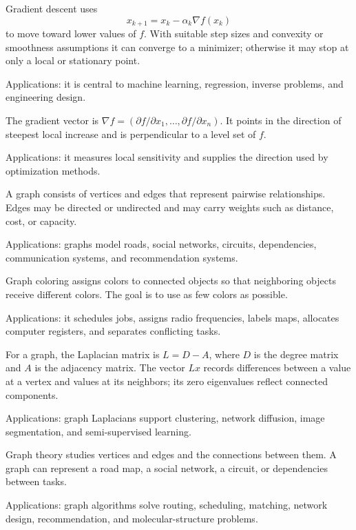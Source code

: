 Gradient descent uses
\[
x_{k+1}=x_k-\alpha_k\nabla f(x_k)
\]
to move toward lower values of $f$. With suitable step sizes and convexity or smoothness assumptions it can converge to a minimizer; otherwise it may stop at only a local or stationary point. \par\noindent Applications: it is central to machine learning, regression, inverse problems, and engineering design.

The gradient vector is $\nabla f=(\partial f/\partial x_1,\ldots,\partial f/\partial x_n)$. It points in the direction of steepest local increase and is perpendicular to a level set of $f$. \par\noindent Applications: it measures local sensitivity and supplies the direction used by optimization methods.

A graph consists of vertices and edges that represent pairwise relationships. Edges may be directed or undirected and may carry weights such as distance, cost, or capacity. \par\noindent Applications: graphs model roads, social networks, circuits, dependencies, communication systems, and recommendation systems.

Graph coloring assigns colors to connected objects so that neighboring objects receive different colors. The goal is to use as few colors as possible. \par\noindent Applications: it schedules jobs, assigns radio frequencies, labels maps, allocates computer registers, and separates conflicting tasks.

For a graph, the Laplacian matrix is $L=D-A$, where $D$ is the degree matrix and $A$ is the adjacency matrix. The vector $Lx$ records differences between a value at a vertex and values at its neighbors; its zero eigenvalues reflect connected components. \par\noindent Applications: graph Laplacians support clustering, network diffusion, image segmentation, and semi-supervised learning.

Graph theory studies vertices and edges and the connections between them. A graph can represent a road map, a social network, a circuit, or dependencies between tasks. \par\noindent Applications: graph algorithms solve routing, scheduling, matching, network design, recommendation, and molecular-structure problems.

